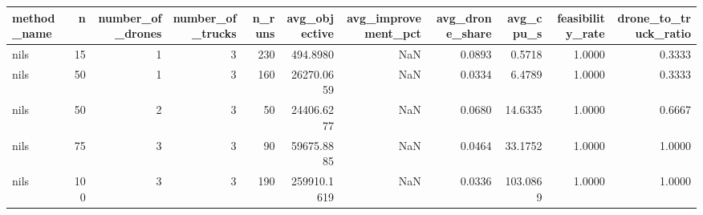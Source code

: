 \begin{tabular}{lrrrrrrrrrr}
\toprule
method_name & n & number_of_drones & number_of_trucks & n_runs & avg_objective & avg_improvement_pct & avg_drone_share & avg_cpu_s & feasibility_rate & drone_to_truck_ratio \\
\midrule
nils & 15 & 1 & 3 & 230 & 494.8980 & NaN & 0.0893 & 0.5718 & 1.0000 & 0.3333 \\
nils & 50 & 1 & 3 & 160 & 26270.0659 & NaN & 0.0334 & 6.4789 & 1.0000 & 0.3333 \\
nils & 50 & 2 & 3 & 50 & 24406.6277 & NaN & 0.0680 & 14.6335 & 1.0000 & 0.6667 \\
nils & 75 & 3 & 3 & 90 & 59675.8885 & NaN & 0.0464 & 33.1752 & 1.0000 & 1.0000 \\
nils & 100 & 3 & 3 & 190 & 259910.1619 & NaN & 0.0336 & 103.0869 & 1.0000 & 1.0000 \\
\bottomrule
\end{tabular}
